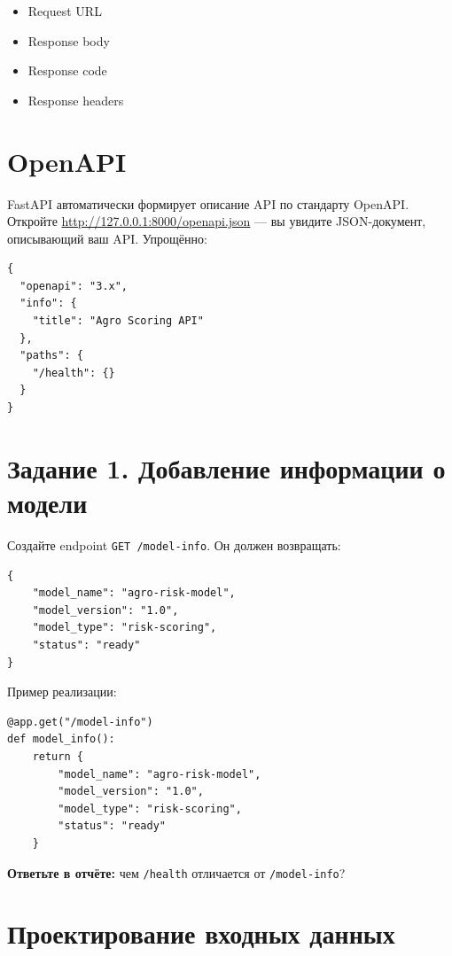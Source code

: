 \documentclass[12pt,a4paper]{article}
\begin{document}
\begin{itemize}
    \item Request URL
    \item Response body
    \item Response code
    \item Response headers
\end{itemize}

\section{OpenAPI}

FastAPI автоматически формирует описание API по стандарту OpenAPI. Откройте \url{http://127.0.0.1:8000/openapi.json} — вы увидите JSON-документ, описывающий ваш API. Упрощённо:

\begin{lstlisting}[caption={Фрагмент OpenAPI-спецификации}]
{
  "openapi": "3.x",
  "info": {
    "title": "Agro Scoring API"
  },
  "paths": {
    "/health": {}
  }
}
\end{lstlisting}

\section{Задание 1. Добавление информации о модели}

Создайте endpoint \texttt{GET /model-info}. Он должен возвращать:

\begin{lstlisting}[caption={Ответ /model-info}]
{
    "model_name": "agro-risk-model",
    "model_version": "1.0",
    "model_type": "risk-scoring",
    "status": "ready"
}
\end{lstlisting}

Пример реализации:

\begin{lstlisting}[caption={Endpoint /model-info}]
@app.get("/model-info")
def model_info():
    return {
        "model_name": "agro-risk-model",
        "model_version": "1.0",
        "model_type": "risk-scoring",
        "status": "ready"
    }
\end{lstlisting}

\textbf{Ответьте в отчёте:} чем \texttt{/health} отличается от \texttt{/model-info}?

\section{Проектирование входных данных}
\end{document}
